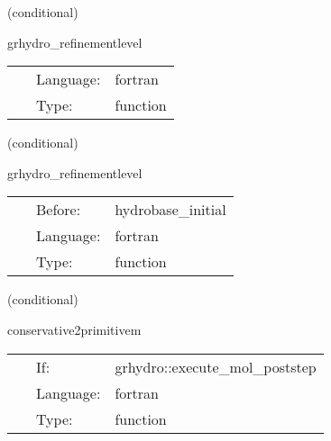 \documentclass{article}
\begin{document}
   (conditional) 

\hspace{5mm} grhydro\_refinementlevel 

\hspace{5mm}{\it calculate current refinement level } 


\hspace{5mm}

 \begin{tabular*}{160mm}{cll} 
~ & Language:  & fortran \\ 
~ & Type:  & function \\ 
\end{tabular*} 


\vspace{5mm}

   (conditional) 

\hspace{5mm} grhydro\_refinementlevel 

\hspace{5mm}{\it calculate current refinement level } 


\hspace{5mm}

 \begin{tabular*}{160mm}{cll} 
~ & Before:  & hydrobase\_initial \\ 
~ & Language:  & fortran \\ 
~ & Type:  & function \\ 
\end{tabular*} 


\vspace{5mm}

   (conditional) 

\hspace{5mm} conservative2primitivem 

\hspace{5mm}{\it convert back to primitive variables (general) - mhd version } 


\hspace{5mm}

 \begin{tabular*}{160mm}{cll} 
~ & If:  & grhydro::execute\_mol\_poststep \\ 
~ & Language:  & fortran \\ 
~ & Type:  & function \\ 
\end{tabular*} 
\end{document}
